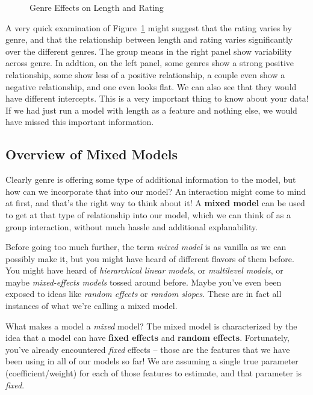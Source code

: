 \documentclass[
  letterpaper,
]{krantz}
\begin{document}
\begin{figure}[H]


\caption{\label{fig-length-genre-rating}Genre Effects on Length and
Rating}

\end{figure}%

A very quick examination of Figure~\ref{fig-length-genre-rating} might
suggest that the rating varies by genre, and that the relationship
between length and rating varies significantly over the different
genres. The group means in the right panel show variability across
genre. In addtion, on the left panel, some genres show a strong positive
relationship, some show less of a positive relationship, a couple even
show a negative relationship, and one even looks flat. We can also see
that they would have different intercepts. This is a very important
thing to know about your data! If we had just run a model with length as
a feature and nothing else, we would have missed this important
information.

\subsection{Overview of Mixed Models}\label{sec-mixed-models-overview}

Clearly genre is offering some type of additional information to the
model, but how can we incorporate that into our model? An interaction
might come to mind at first, and that's the right way to think about it!
A \textbf{mixed model} can be used to get at that type of relationship
into our model, which we can think of as a group interaction, without
much hassle and additional explanability.

Before going too much further, the term \emph{mixed model} is as vanilla
as we can possibly make it, but you might have heard of different
flavors of them before. You might have heard of \emph{hierarchical
linear models}, or \emph{multilevel models}, or maybe
\emph{mixed-effects models} tossed around before. Maybe you've even been
exposed to ideas like \emph{random effects} or \emph{random slopes}.
These are in fact all instances of what we're calling a mixed model.

What makes a model a \emph{mixed} model? The mixed model is
characterized by the idea that a model can have \textbf{fixed effects}
and \textbf{random effects}. Fortunately, you've already encountered
\emph{fixed} effects -- those are the features that we have been using
in all of our models so far! We are assuming a single true parameter
(coefficient/weight) for each of those features to estimate, and that
parameter is \emph{fixed}.
\end{document}
